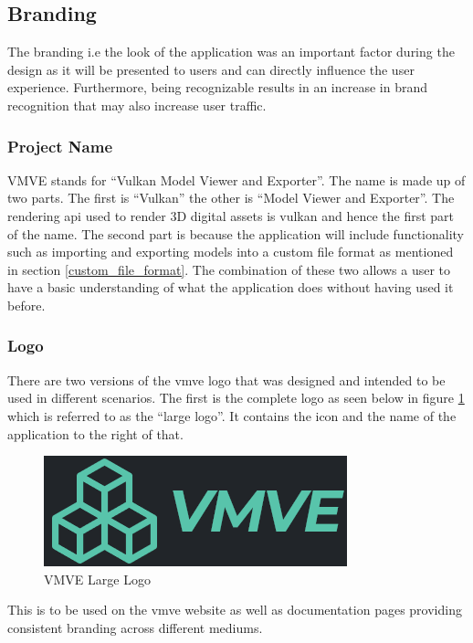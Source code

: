 \documentclass[11pt]{article}
\begin{document}
\subsection{Branding}
The branding i.e the look of the application was an important factor during the
design as it will be presented to users and can directly influence the user
experience. Furthermore, being recognizable results in an increase in brand
recognition that may also increase user traffic.

\subsubsection{Project Name}
VMVE stands for ``Vulkan Model Viewer and Exporter''. The name is made up of
two parts. The first is ``Vulkan'' the other is ``Model Viewer and Exporter''.
The rendering \gls*{api} used to render 3D digital assets is \gls*{vulkan} and
hence the first part of the name. The second part is because the application
will include functionality such as importing and exporting models into a custom
file format as mentioned in section \ref{custom_file_format}. The combination of
these two allows a user to have a basic understanding of what the application
does without having used it before.

\subsubsection{Logo}
There are two versions of the \gls*{vmve} logo that was designed and intended to
be used in different scenarios. The first is the complete logo as seen below in
figure \ref{fig:project_logo_large} which is referred to as the ``large logo''.
It contains the icon and the name of the application to the right of that.
\begin{figure}[H]
  \centering
  \includegraphics[width=\textwidth]{images/project_logo.png}
  \caption{VMVE Large Logo}
  \label{fig:project_logo_large}
\end{figure}
This is to be used on the \gls*{vmve} website as well as documentation pages
providing consistent branding across different mediums.
\end{document}
